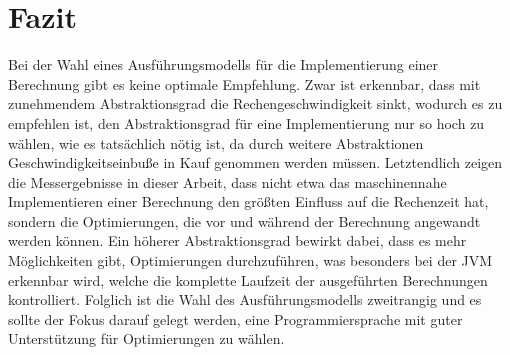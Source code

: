 \documentclass[11pt, parskip=half]{scrartcl}       %
\begin{document}
\section{Fazit}

Bei der Wahl eines Ausführungsmodells für die Implementierung einer Berechnung gibt es keine optimale Empfehlung.
Zwar ist erkennbar, dass mit zunehmendem Abstraktionsgrad die Rechengeschwindigkeit sinkt, wodurch es zu empfehlen ist, den Abstraktionsgrad für eine Implementierung nur so hoch zu wählen, wie es tatsächlich nötig ist, da durch weitere Abstraktionen Geschwindigkeitseinbuße in Kauf genommen werden müssen.
Letztendlich zeigen die Messergebnisse in dieser Arbeit, dass nicht etwa das maschinennahe Implementieren einer Berechnung den größten Einfluss auf die Rechenzeit hat, sondern die Optimierungen, die vor und während der Berechnung angewandt werden können.
Ein höherer Abstraktionsgrad bewirkt dabei, dass es mehr Möglichkeiten gibt, Optimierungen durchzuführen, was besonders bei der JVM erkennbar wird, welche die komplette Laufzeit der ausgeführten Berechnungen kontrolliert.
Folglich ist die Wahl des Ausführungsmodells zweitrangig und es sollte der Fokus darauf gelegt werden, eine Programmiersprache mit guter Unterstützung für Optimierungen zu wählen.
\end{document}
